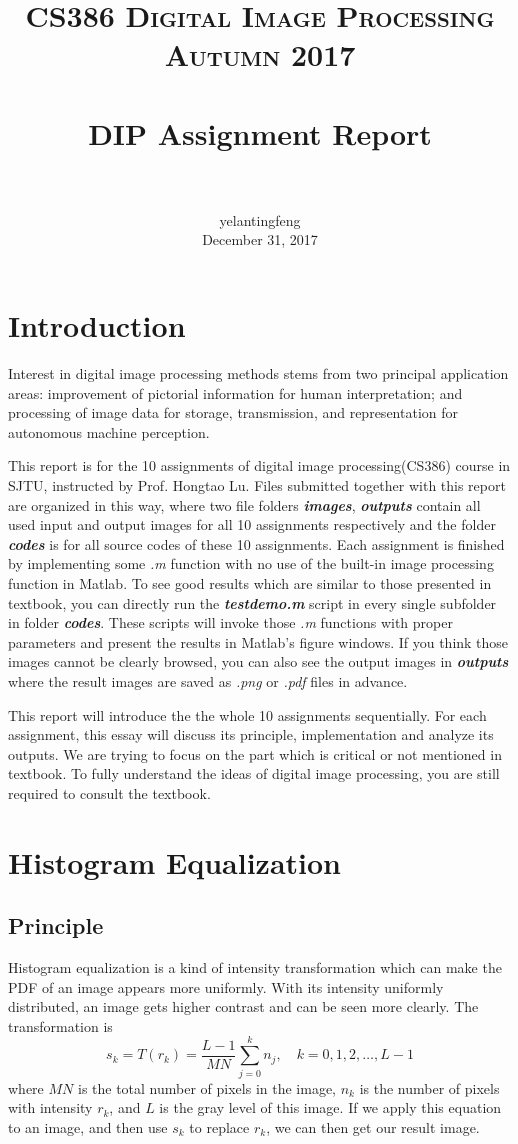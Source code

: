 \documentclass[11pt,a4paper]{article}
\title{
		\usefont{OT1}{bch}{b}{n}
		\normalfont \normalsize \textsc{CS386 Digital Image Processing Autumn 2017} \\ [25pt]
		\horrule{0.5pt} \\[0.4cm]
		\huge DIP Assignment Report \\
		\horrule{2pt} \\[0.5cm]
}
\author{
		\normalfont 								\normalsize
        yelantingfeng
        \\\normalsize
		December 31, 2017
}
\date{}
\begin{document}
\maketitle

\setcounter{section}{-1}
\section{Introduction}
Interest in digital image processing methods stems from two principal application
areas: improvement of pictorial information for human interpretation; and
processing of image data for storage, transmission, and representation for autonomous
machine perception\cite{DIP}.

This report is for the 10 assignments of digital image processing(CS386) course in SJTU, instructed
by Prof. Hongtao Lu. Files submitted together with this report are organized in this way,
 where two file folders \textbf{\emph{images}}, \textbf{\emph{outputs}} contain all used input and output images
for all 10 assignments respectively and the folder \textbf{\emph{codes}} is for all source codes of these 10
assignments. Each assignment is finished by implementing some \emph{.m} function with no use of the built-in image
processing function in Matlab. To see good results which are similar to those presented in textbook, you can directly
run the \textbf{\emph{testdemo.m}} script in every single subfolder in folder \textbf{\emph{codes}}. These scripts
will invoke those \emph{.m} functions with proper parameters and present the results in Matlab's figure windows.
If you think those images cannot be clearly browsed, you can also see the output images in \textbf{\emph{outputs}}
where the result images are saved as \emph{.png} or \emph{.pdf} files in advance.

This report will introduce the the whole 10 assignments sequentially. For each assignment, this essay
will discuss its principle, implementation and analyze its outputs. We are trying to focus on the part 
which is critical or not mentioned in textbook. To fully understand the ideas of digital image processing,
 you are still required to consult the textbook.

\section{Histogram Equalization}
\subsection{Principle}
Histogram equalization is a kind of intensity transformation which can make the PDF of an image appears more 
uniformly. With its intensity uniformly distributed, an image gets higher contrast and can be seen more clearly.
The transformation is 
\begin{equation}
	s_k=T(r_k)=\frac{L-1}{MN}\sum_{j=0}^k n_j,\quad k=0,1,2,\dots,L-1
\end{equation}
where $MN$ is the total number of pixels in the image, $n_k$ is the number of pixels with 
intensity $r_k$, and $L$ is the gray level of this image. If we apply this equation to an image, and then 
use $s_k$ to replace $r_k$, we can then get our result image.
\end{document}
